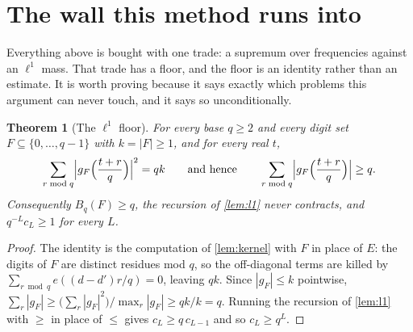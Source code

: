 \documentclass[11pt]{amsart}
\newtheorem{theorem}{Theorem}[section]
\theoremstyle{definition}
\theoremstyle{remark}
\begin{document}
\section{The wall this method runs into}
\label{sec:wall}

Everything above is bought with one trade: a supremum over frequencies against an $\ell^1$ mass. That trade has a floor, and the floor is an identity rather than an estimate. It is worth proving because it says exactly which problems this argument can never touch, and it says so unconditionally.

\begin{theorem}[The $\ell^1$ floor]
\label{thm:floor}
For every base $q \ge 2$ and every digit set $F \subseteq \{0,\dots,q-1\}$ with $k = |F| \ge 1$, and for every real $t$,
\[
  \sum_{r \bmod q} \Bigl| g_F\Bigl( \frac{t+r}{q} \Bigr) \Bigr|^2 = qk
  \qquad\text{and hence}\qquad
  \sum_{r \bmod q} \Bigl| g_F\Bigl( \frac{t+r}{q} \Bigr) \Bigr| \ge q .
\]
Consequently $B_q(F) \ge q$, the recursion of \cref{lem:l1} never contracts, and $q^{-L} c_L \ge 1$ for every $L$.
\end{theorem}

\begin{proof}
The identity is the computation of \cref{lem:kernel} with $F$ in place of $E$: the digits of $F$ are distinct residues mod $q$, so the off-diagonal terms are killed by $\sum_{r \bmod q} e((d-d')r/q) = 0$, leaving $qk$. Since $|g_F| \le k$ pointwise, $\sum_r |g_F| \ge \bigl(\sum_r |g_F|^2\bigr)/\max_r |g_F| \ge qk/k = q$. Running the recursion of \cref{lem:l1} with $\ge$ in place of $\le$ gives $c_L \ge q\, c_{L-1}$ and so $c_L \ge q^L$.
\end{proof}
\end{document}

